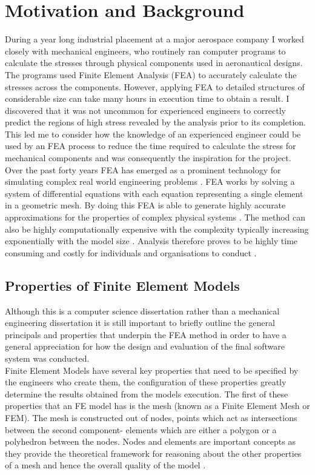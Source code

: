 \section{Motivation and Background}
During a year long industrial placement at a major aerospace company I worked closely with mechanical engineers, who routinely ran computer programs to calculate the stresses through physical components used in aeronautical designs. The programs used Finite Element Analysis (FEA) to accurately calculate the stresses across the components. However, applying FEA to detailed structures of considerable size can take many hours in execution time to obtain a result. I discovered that it was not uncommon for experienced engineers to correctly predict the regions of high stress revealed by the analysis prior to its completion. This led me to consider how the knowledge of an experienced engineer could be used by an FEA process to reduce the time required to calculate the stress for mechanical components and was consequently the inspiration for the project. \\ 

\noindent
Over the past forty years FEA has emerged as a prominent technology for simulating complex real world engineering problems \cite{cite0, DolsakPaper94}. FEA works by solving a system of differential equations with each equation representing a single element in a geometric mesh. By doing this FEA is able to generate highly accurate approximations for the properties of complex physical systems \cite{DolsakPaper94, IntroductionToFE}. The method can also be highly computationally expensive with the complexity typically increasing exponentially with the model size \cite{DolsakPaper94}. Analysis therefore proves to be highly time consuming and costly for individuals and organisations to conduct \cite{ConsultRuleIntellSystemFE, cite03}.\\


\subsection{Properties of Finite Element Models}
Although this is a computer science dissertation rather than a mechanical engineering dissertation it is still important to briefly outline the general principals and properties that underpin the FEA method in order to have a general appreciation for how the design and evaluation of the final software system was conducted. \\ 

\noindent
Finite Element Models have several key properties that need to be specified by the engineers who create them, the configuration of these properties greatly determine the results obtained from the models execution. The first of these properties that an FE model has is the mesh (known as a Finite Element Mesh or FEM). The mesh is constructed out of nodes, points which act as intersections between the second component- elements which are either a polygon or a polyhedron between the nodes. Nodes and elements are important concepts as they provide the theoretical framework for reasoning about the other properties of a mesh and hence the overall quality of the model \cite{IntroductionToFE}.\\ 

